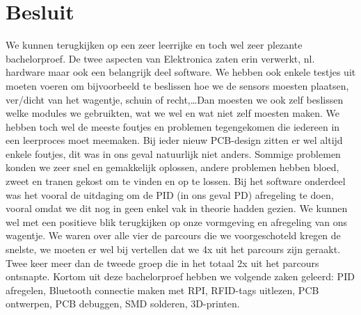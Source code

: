 \chapter{Besluit}
We kunnen terugkijken op een zeer leerrijke en toch wel zeer plezante bachelorproef. De twee aspecten van Elektronica zaten erin verwerkt, nl. hardware maar ook een belangrijk deel software. We hebben ook enkele testjes uit moeten voeren om bijvoorbeeld te beslissen hoe we de sensors moesten plaatsen, ver/dicht van het wagentje, schuin of recht,\ldots Dan moesten we ook zelf beslissen welke modules we gebruikten, wat we wel en wat niet zelf moesten maken. We hebben toch wel de meeste foutjes en problemen tegengekomen die iedereen in een leerproces moet meemaken. Bij ieder nieuw PCB-design zitten er wel altijd enkele foutjes, dit was in ons geval natuurlijk niet anders. Sommige problemen konden we zeer snel en gemakkelijk oplossen, andere problemen hebben bloed, zweet en tranen gekost om te vinden en op te lossen. Bij het software onderdeel was het vooral de uitdaging om de PID (in ons geval PD) afregeling te doen, vooral omdat we dit nog in geen enkel vak in theorie hadden gezien. We kunnen wel met een positieve blik terugkijken op onze vormgeving en afregeling van ons wagentje. We waren over alle vier de parcours die we voorgeschoteld kregen de snelste, we moeten er wel bij vertellen dat we 4x uit het parcours zijn geraakt. Twee keer meer dan de tweede groep die in het totaal 2x uit het parcours ontsnapte. Kortom uit deze bachelorproef hebben we volgende zaken geleerd: PID afregelen, Bluetooth connectie maken met RPI, RFID-tags uitlezen, PCB ontwerpen, PCB debuggen, SMD solderen, 3D-printen. 
